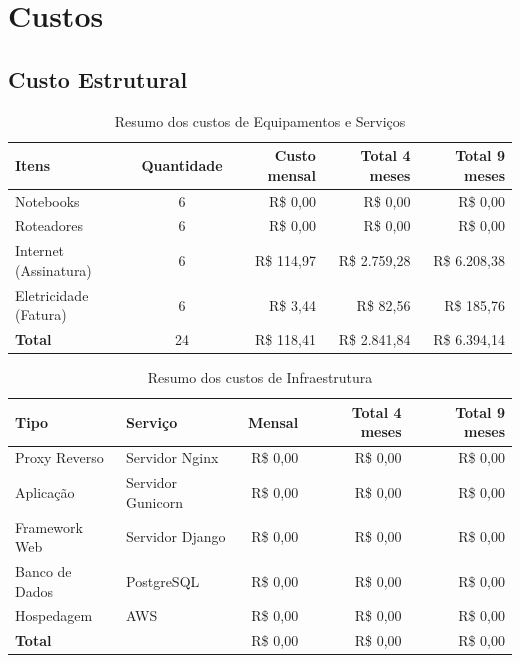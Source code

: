 \documentclass[
	12pt,				%
	openany,			%
	twoside,			%
	a4paper,			%
	english,			%
	french,				%
	spanish,			%
	brazil				%
	]{abntex2}
\begin{document}
\section{Custos}
\subsection{Custo Estrutural}

\begin{table}[h!]
	\centering
	\caption{Resumo dos custos de Equipamentos e Serviços}
	\label{tab:equipamentos-servicos}
	\begin{tabular}{|l|c|r|r|r|}
		\hline
		\textbf{Itens} & \textbf{Quantidade} & \textbf{Custo mensal} & \textbf{Total 4 meses} & \textbf{Total 9 meses} \\
		\hline
		Notebooks & 6 & R\$ 0,00 & R\$ 0,00 & R\$ 0,00 \\
		\hline
		Roteadores & 6 & R\$ 0,00 & R\$ 0,00 & R\$ 0,00 \\
		\hline
		Internet (Assinatura) & 6 & R\$ 114,97 & R\$ 2.759,28 & R\$ 6.208,38 \\
		\hline
		Eletricidade (Fatura) & 6 & R\$ 3,44 & R\$ 82,56 & R\$ 185,76 \\
		\hline
		\textbf{Total} & 24 & R\$ 118,41 & R\$ 2.841,84 & R\$ 6.394,14 \\
		\hline
	\end{tabular}
\end{table}


\begin{table}[h!]
	\centering
	\caption{Resumo dos custos de Infraestrutura}
	\label{tab:infraestrutura}
	\begin{tabular}{|l|l|r|r|r|}
		\hline
		\textbf{Tipo} & \textbf{Serviço} & \textbf{Mensal} & \textbf{Total 4 meses} & \textbf{Total 9 meses} \\
		\hline
		Proxy Reverso & Servidor Nginx & R\$ 0,00 & R\$ 0,00 & R\$ 0,00 \\
		\hline
		Aplicação & Servidor Gunicorn & R\$ 0,00 & R\$ 0,00 & R\$ 0,00 \\
		\hline
		Framework Web & Servidor Django & R\$ 0,00 & R\$ 0,00 & R\$ 0,00 \\
		\hline
		Banco de Dados & PostgreSQL & R\$ 0,00 & R\$ 0,00 & R\$ 0,00 \\
		\hline
		Hospedagem & AWS & R\$ 0,00 & R\$ 0,00 & R\$ 0,00 \\
		\hline
		\textbf{Total} & & R\$ 0,00 & R\$ 0,00 & R\$ 0,00 \\
		\hline
	\end{tabular}
\end{table}
\end{document}
